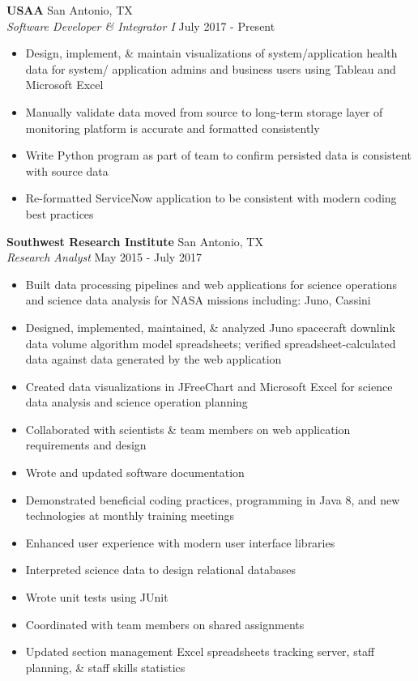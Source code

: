 \documentclass[a4paper]{article}
\begin{document}
\textbf{USAA} \hfill San Antonio, TX\\
\textit{Software Developer \& Integrator I} \hfill July 2017 - Present\\
\vspace{-1mm}
\begin{itemize} \itemsep 1pt
	\item Design, implement, \& maintain visualizations of system/application health data for system/ application admins and business users using Tableau and Microsoft Excel
	\item Manually validate data moved from source to long-term storage layer of monitoring platform is accurate and formatted consistently
	\item Write Python program as part of team to confirm persisted data is consistent with source data
	\item Re-formatted ServiceNow application to be consistent with modern coding best practices
\end{itemize}
\textbf{Southwest Research Institute} \hfill San Antonio, TX\\
\textit{Research Analyst} \hfill May 2015 - July 2017\\
\vspace{-1mm}
\begin{itemize} \itemsep 1pt
	\item Built data processing pipelines and web applications for science operations and science data analysis for NASA missions including: Juno, Cassini
	\item Designed, implemented, maintained, \& analyzed Juno spacecraft downlink data volume algorithm model spreadsheets; verified spreadsheet-calculated data against data generated by the web application
	\item Created data visualizations in JFreeChart and Microsoft Excel for science data analysis and science operation planning
	\item Collaborated with scientists \& team members on web application requirements and design
	\item Wrote and updated software documentation
	\item Demonstrated beneficial coding practices, programming in Java 8, and new technologies at monthly training meetings
	\item Enhanced user experience with modern user interface libraries
	\item Interpreted science data to design relational databases
	\item Wrote unit tests using JUnit
	\item Coordinated with team members on shared assignments
	\item Updated section management Excel spreadsheets tracking server, staff planning, \& staff skills statistics
\end{itemize}
\end{document}
